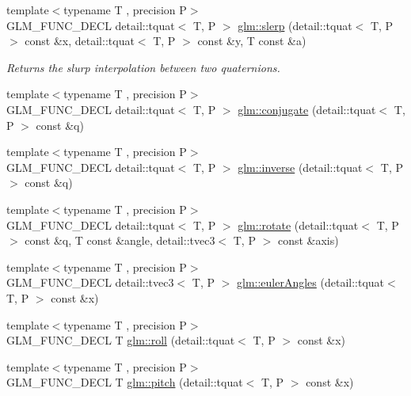 \begin{DoxyCompactItemize}
\item 
{\footnotesize template$<$typename T , precision P$>$ }\\G\-L\-M\-\_\-\-F\-U\-N\-C\-\_\-\-D\-E\-C\-L detail\-::tquat$<$ T, P $>$ \hyperlink{group__gtc__quaternion_ga7468a211a20ea56ea5cfb0625226868a}{glm\-::slerp} (detail\-::tquat$<$ T, P $>$ const \&x, detail\-::tquat$<$ T, P $>$ const \&y, T const \&a)
\begin{DoxyCompactList}\small\item\em Returns the slurp interpolation between two quaternions. \end{DoxyCompactList}\item 
{\footnotesize template$<$typename T , precision P$>$ }\\G\-L\-M\-\_\-\-F\-U\-N\-C\-\_\-\-D\-E\-C\-L detail\-::tquat$<$ T, P $>$ \hyperlink{group__gtc__quaternion_gaf78006c47276b151777fc194cf11a688}{glm\-::conjugate} (detail\-::tquat$<$ T, P $>$ const \&q)
\item 
{\footnotesize template$<$typename T , precision P$>$ }\\G\-L\-M\-\_\-\-F\-U\-N\-C\-\_\-\-D\-E\-C\-L detail\-::tquat$<$ T, P $>$ \hyperlink{group__gtc__quaternion_ga6613ef61cb980a18f19ece5f421564da}{glm\-::inverse} (detail\-::tquat$<$ T, P $>$ const \&q)
\item 
{\footnotesize template$<$typename T , precision P$>$ }\\G\-L\-M\-\_\-\-F\-U\-N\-C\-\_\-\-D\-E\-C\-L detail\-::tquat$<$ T, P $>$ \hyperlink{group__gtc__quaternion_gaa9a8891f03d8f5373525c4b3159c1c73}{glm\-::rotate} (detail\-::tquat$<$ T, P $>$ const \&q, T const \&angle, detail\-::tvec3$<$ T, P $>$ const \&axis)
\item 
{\footnotesize template$<$typename T , precision P$>$ }\\G\-L\-M\-\_\-\-F\-U\-N\-C\-\_\-\-D\-E\-C\-L detail\-::tvec3$<$ T, P $>$ \hyperlink{group__gtc__quaternion_gade4034f49ccadf63cb31a7fb5fa3c8aa}{glm\-::euler\-Angles} (detail\-::tquat$<$ T, P $>$ const \&x)
\item 
{\footnotesize template$<$typename T , precision P$>$ }\\G\-L\-M\-\_\-\-F\-U\-N\-C\-\_\-\-D\-E\-C\-L T \hyperlink{group__gtc__quaternion_ga6d883e423bc425f4334fcce202131f7e}{glm\-::roll} (detail\-::tquat$<$ T, P $>$ const \&x)
\item 
{\footnotesize template$<$typename T , precision P$>$ }\\G\-L\-M\-\_\-\-F\-U\-N\-C\-\_\-\-D\-E\-C\-L T \hyperlink{group__gtc__quaternion_ga4d345dc369a54f53f5ebc375bac56d11}{glm\-::pitch} (detail\-::tquat$<$ T, P $>$ const \&x)

\end{DoxyCompactItemize}
